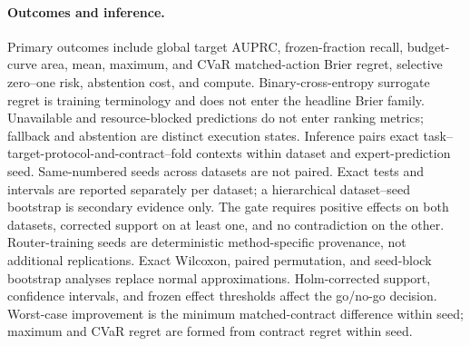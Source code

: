 \paragraph{Outcomes and inference.}
Primary outcomes include global target AUPRC, frozen-fraction recall,
budget-curve area, mean, maximum, and CVaR matched-action Brier regret, selective
zero--one risk, abstention cost, and compute. Binary-cross-entropy surrogate
regret is training terminology and does not enter the headline Brier family.
Unavailable and resource-blocked predictions do not enter
ranking metrics; fallback and abstention are distinct execution states.
Inference pairs exact task--target-protocol-and-contract--fold contexts within
dataset and expert-prediction seed. Same-numbered seeds across datasets are not
paired. Exact tests and intervals are reported separately per dataset; a
hierarchical dataset--seed bootstrap is secondary evidence only. The gate
requires positive effects on both datasets, corrected support on at least one,
and no contradiction on the other. Router-training seeds are deterministic
method-specific provenance, not additional replications. Exact Wilcoxon,
paired permutation, and seed-block bootstrap analyses replace normal
approximations. Holm-corrected support, confidence intervals, and frozen effect
thresholds affect the go/no-go decision. Worst-case improvement is the minimum
matched-contract difference within seed; maximum and CVaR regret are formed
from contract regret within seed.
